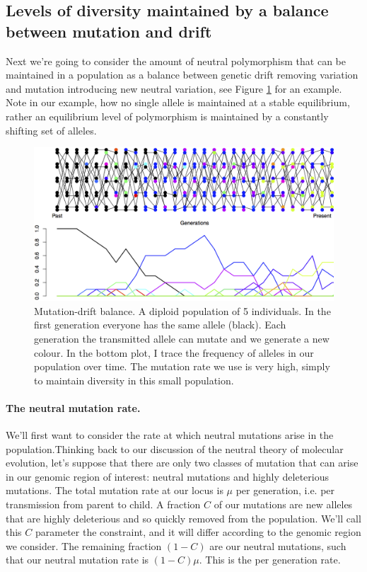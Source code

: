 \subsection{Levels of diversity maintained by a balance between
 mutation and drift} \label{DriftMutationBalance}

Next we're going to consider the amount of neutral polymorphism that can be maintained in a population as a balance between genetic drift removing variation and mutation introducing new neutral variation, see Figure \ref{fig:Mut_Sel_balance} for an example. Note in our example, how no single allele is maintained at a stable equilibrium, rather an equilibrium level of polymorphism is maintained by a constantly shifting set of alleles.

\begin{figure} \begin{center} \includegraphics[width= 0.8
\textwidth]{figures/Mut_drift_balance.png} \end{center} \caption{Mutation-drift
balance. A diploid population of 5 individuals. In the first generation
everyone has the same allele (black). Each generation the transmitted allele
can mutate and we generate a new colour. In the bottom plot, I trace the
frequency of alleles in our population over time. The mutation rate we use is very high, simply to maintain diversity in this small population. } \label{fig:Mut_Sel_balance}
\end{figure}

\paragraph{The neutral mutation rate.}
We'll first want to consider the rate at which neutral mutations arise in the population.Thinking back to our discussion of the neutral theory of molecular evolution, let's suppose that there are only two classes of mutation that can arise in our genomic region of interest: neutral mutations and highly deleterious mutations. The total mutation rate at our locus is $\mu$ per generation, i.e. per transmission from parent to child. A fraction $C$ of our mutations are new alleles that are highly deleterious and so quickly removed from the population. We'll call this $C$ parameter the constraint, and it will differ according to the genomic region we consider.  The remaining fraction $(1-C)$ are our neutral mutations, such that our neutral mutation rate is $(1-C)\mu$. This is the per generation rate.

